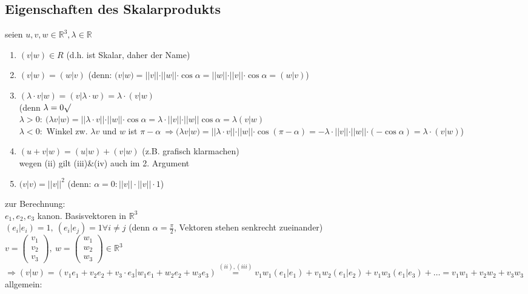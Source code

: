\subsection{Eigenschaften des Skalarprodukts}
seien $u,v,w \in \mathbb{R}^3, \lambda\in \mathbb{R}$
\begin{enumerate}
	\item $(v|w)\in R$ (d.h. ist Skalar, daher der Name)
	\item $(v|w)=(w|v)$ (denn: $(v|w)=||v||\cdot ||w||\cdot \cos \alpha = ||w||\cdot ||v||\cdot \cos\alpha = (w|v)$)
	\item $(\lambda\cdot v|w)=(v|\lambda\cdot w) = \lambda\cdot (v|w)$\\
	(denn $\lambda=0 \surd$\\
	$\lambda >0: \ (\lambda v|w)=||\lambda\cdot v||\cdot ||w||\cdot \cos \alpha=\lambda\cdot ||v||\cdot ||w||\cos\alpha = \lambda(v|w)$\\
	$\lambda <0:$ Winkel zw. $\lambda v$ und $w$ ist $\pi -\alpha \ \Rightarrow (\lambda v|w)=||\lambda\cdot v||\cdot ||w||\cdot \cos(\pi-\alpha) = -\lambda\cdot ||v||\cdot ||w||\cdot (-\cos \alpha) = \lambda\cdot (v|w)$)
	\item $(u+v|w)=(u|w)+(v|w)$ (z.B. grafisch klarmachen)\\
	wegen (ii) gilt (iii)\&(iv) auch im 2. Argument
	
	\item $(v|v)=||v||^2$ (denn: $\alpha =0: ||v||\cdot ||v||\cdot 1$)
\end{enumerate}
zur Berechnung:\\
$e_1,e_2,e_3$ kanon. Basisvektoren in $\mathbb{R}^3$\\
$(e_i|e_i)=1, \ (e_i|e_j)=1 \forall i\neq j$ (denn $\alpha=\frac{\pi}{2}$, Vektoren stehen senkrecht zueinander)\\
$v=\begin{pmatrix}v_1 \\ v_2 \\ v_3\end{pmatrix}, \ w=\begin{pmatrix}w_1 \\ w_2 \\ w_3\end{pmatrix}\in \mathbb{R}^3$\\
$\Rightarrow (v|w)=(v_1e_1+v_2e_2+v_3\cdot e_3 | w_1e_1+w_2e_2+w_3e_3) \stackrel{(ii),(iii)}{=} v_1w_1(e_1|e_1)+v_1w_2(e_1|e_2)+v_1w_3(e_1|e_3)+\dots = v_1w_1+v_2w_2+v_3w_3$\\
allgemein:

